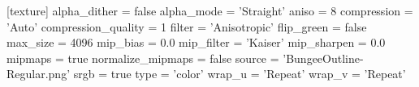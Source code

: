 [texture]
alpha_dither = false
alpha_mode = 'Straight'
aniso = 8
compression = 'Auto'
compression_quality = 1
filter = 'Anisotropic'
flip_green = false
max_size = 4096
mip_bias = 0.0
mip_filter = 'Kaiser'
mip_sharpen = 0.0
mipmaps = true
normalize_mipmaps = false
source = 'BungeeOutline-Regular.png'
srgb = true
type = 'color'
wrap_u = 'Repeat'
wrap_v = 'Repeat'